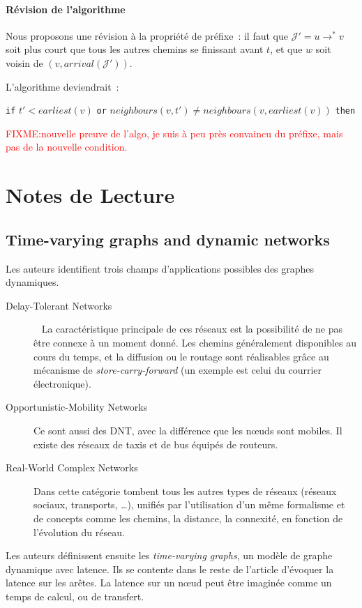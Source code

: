 \documentclass[12pt,a4paper]{article}
\begin{document}
\paragraph{Révision de l'algorithme}
Nous proposons une révision à la propriété de préfixe~: il faut que
\(\mathcal{J}' = u \rightarrow^* v\) soit plus court que tous les
autres chemins se finissant avant \(t\), et que \(w\) soit voisin de
\((v, arrival(\mathcal{J}'))\).

L'algorithme deviendrait~:
\begin{center}
  \verb|if| \(t' < earliest(v)\) \verb|or|
  \(neighbours(v, t') \neq neighbours(v, earliest(v))\) \verb|then|
\end{center}

\textcolor{red}{FIXME:\@ nouvelle preuve de l'algo, je suis à peu près
  convaincu du préfixe, mais pas de la nouvelle condition.}

\section{Notes de Lecture}
\subsection{Time-varying graphs and dynamic
  networks~\cite{casteigts2012time}}
Les auteurs identifient trois champs d'applications possibles des
graphes dynamiques.
\begin{description}
\item[Delay-Tolerant Networks]~\cite{fall2007delay} La caractéristique
  principale de ces réseaux est la possibilité de ne pas être connexe
  à un moment donné. Les chemins généralement disponibles au cours du
  temps, et la diffusion ou le routage sont réalisables grâce au
  mécanisme de \textit{store-carry-forward} (un exemple est celui du
  courrier électronique).
\item[Opportunistic-Mobility Networks] Ce sont aussi des DNT, avec la
  différence que les nœuds sont mobiles. Il existe des réseaux de
  taxis et de bus équipés de routeurs.
\item[Real-World Complex Networks] Dans cette catégorie tombent tous
  les autres types de réseaux (réseaux sociaux, transports, …),
  unifiés par l'utilisation d'un même formalisme et de concepts comme
  les chemins, la distance, la connexité, en fonction de l'évolution
  du réseau.
\end{description}

Les auteurs définissent ensuite les \textit{time-varying graphs}, un
modèle de graphe dynamique avec latence. Ils se contente dans le reste
de l'article d'évoquer la latence sur les arêtes. La latence sur un
nœud peut être imaginée comme un temps de calcul, ou de transfert.
\end{document}
